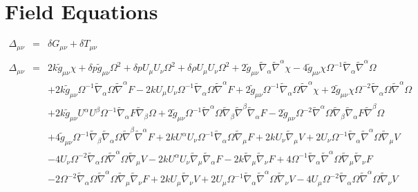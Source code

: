 \documentclass[10pt,letterpaper]{article}
\numberwithin{equation}{section}
\begin{document}
\section{Field Equations}
\begin{eqnarray}
\Delta_{\mu\nu}&=&\delta G_{\mu\nu} + \delta T_{\mu\nu}
\\ \nonumber\\
\Delta_{\mu\nu}&=& 2 k \tilde{g}_{\mu \nu } \chi + \delta p \tilde{g}_{\mu \nu } \Omega^2 + \delta p U_{\mu } U_{\nu } \Omega^2 + \delta \rho U_{\mu } U_{\nu } \Omega^2 + 2 \tilde{g}_{\mu \nu } \tilde{\nabla}_{\alpha }\tilde{\nabla}^{\alpha }\chi - 4 \tilde{g}_{\mu \nu } \chi \Omega^{-1} \tilde{\nabla}_{\alpha }\tilde{\nabla}^{\alpha }\Omega \nonumber \\ 
&& + 2 k \tilde{g}_{\mu \nu } \Omega^{-1} \tilde{\nabla}_{\alpha }\Omega \tilde{\nabla}^{\alpha }F - 2 k U_{\mu } U_{\nu } \Omega^{-1} \tilde{\nabla}_{\alpha }\Omega \tilde{\nabla}^{\alpha }F + 2 \tilde{g}_{\mu \nu } \Omega^{-1} \tilde{\nabla}_{\alpha }\Omega \tilde{\nabla}^{\alpha }\chi + 2 \tilde{g}_{\mu \nu } \chi \Omega^{-2} \tilde{\nabla}_{\alpha }\Omega \tilde{\nabla}^{\alpha }\Omega \nonumber \\ 
&& + 2 k \tilde{g}_{\mu \nu } U^{\alpha } U^{\beta } \Omega^{-1} \tilde{\nabla}_{\alpha }F \tilde{\nabla}_{\beta }\Omega + 2 \tilde{g}_{\mu \nu } \Omega^{-1} \tilde{\nabla}^{\alpha }\Omega \tilde{\nabla}_{\beta }\tilde{\nabla}^{\beta }\tilde{\nabla}_{\alpha }F - 2 \tilde{g}_{\mu \nu } \Omega^{-2} \tilde{\nabla}^{\alpha }\Omega \tilde{\nabla}_{\beta }\tilde{\nabla}_{\alpha }F \tilde{\nabla}^{\beta }\Omega \nonumber \\ 
&& + 4 \tilde{g}_{\mu \nu } \Omega^{-1} \tilde{\nabla}_{\beta }\tilde{\nabla}_{\alpha }\Omega \tilde{\nabla}^{\beta }\tilde{\nabla}^{\alpha }F + 2 k U^{\alpha } U_{\nu } \Omega^{-1} \tilde{\nabla}_{\alpha }\Omega \tilde{\nabla}_{\mu }F + 2 k U_{\nu } \tilde{\nabla}_{\mu }V + 2 U_{\nu } \Omega^{-1} \tilde{\nabla}_{\alpha }\tilde{\nabla}^{\alpha }\Omega \tilde{\nabla}_{\mu }V \nonumber \\ 
&& - 4 U_{\nu } \Omega^{-2} \tilde{\nabla}_{\alpha }\Omega \tilde{\nabla}^{\alpha }\Omega \tilde{\nabla}_{\mu }V - 2 k U^{\alpha } U_{\nu } \tilde{\nabla}_{\mu }\tilde{\nabla}_{\alpha }F - 2 k \tilde{\nabla}_{\mu }\tilde{\nabla}_{\nu }F + 4 \Omega^{-1} \tilde{\nabla}_{\alpha }\tilde{\nabla}^{\alpha }\Omega \tilde{\nabla}_{\mu }\tilde{\nabla}_{\nu }F \nonumber \\ 
&& - 2 \Omega^{-2} \tilde{\nabla}_{\alpha }\Omega \tilde{\nabla}^{\alpha }\Omega \tilde{\nabla}_{\mu }\tilde{\nabla}_{\nu }F + 2 k U_{\mu } \tilde{\nabla}_{\nu }V + 2 U_{\mu } \Omega^{-1} \tilde{\nabla}_{\alpha }\tilde{\nabla}^{\alpha }\Omega \tilde{\nabla}_{\nu }V - 4 U_{\mu } \Omega^{-2} \tilde{\nabla}_{\alpha }\Omega \tilde{\nabla}^{\alpha }\Omega \tilde{\nabla}_{\nu }V \nonumber \\ 

\end{eqnarray}
\end{document}

